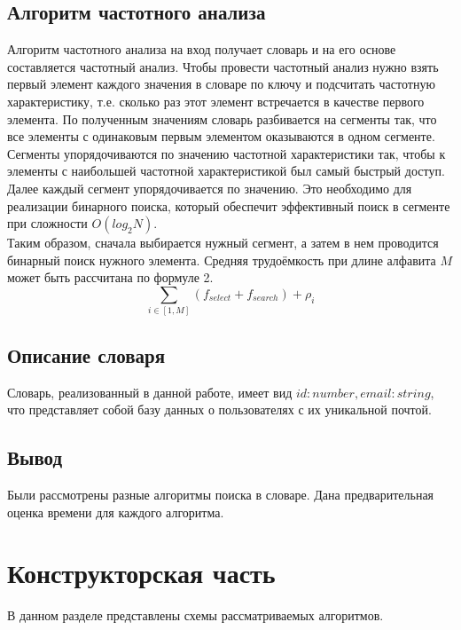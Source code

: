 \documentclass[a4paper, 12pt]{article}
\begin{document}
	\subsection{Алгоритм частотного анализа}
	\hspace*{5mm}Алгоритм частотного анализа на вход получает словарь и на его основе составляется частотный анализ. Чтобы провести частотный анализ нужно взять первый элемент каждого значения в словаре по ключу и подсчитать частотную характеристику, т.е. сколько раз этот элемент встречается в качестве первого элемента. По полученным значениям словарь разбивается на сегменты так, что все элементы с одинаковым первым элементом оказываются в одном сегменте.
	\\ \hspace*{5mm} Сегменты упорядочиваются по значению частотной характеристики так, чтобы к элементы с наибольшей частотной характеристикой был самый быстрый доступ.
	\\ \hspace*{5mm} Далее каждый сегмент упорядочивается по значению. Это необходимо
	для реализации бинарного поиска, который обеспечит эффективный поиск
	в сегменте при сложности $O(log_2N)$.
	\\ \hspace*{5mm} Таким образом, сначала выбирается нужный сегмент, а затем в нем проводится бинарный поиск нужного элемента. Средняя трудоёмкость при длине алфавита $M$ может быть рассчитана по формуле 2.
	\begin{equation}
		\sum\limits_{i\in[1, M]}(f_{select} + f_{search}) + \rho_i
	\end{equation}
	\subsection{Описание словаря}
	\hspace*{5mm} Словарь, реализованный в данной работе, имеет вид ${id: number, email: string}$, что представляет собой базу данных о пользователях с их уникальной почтой.
	\subsection{Вывод}
	\hspace*{5mm} Были рассмотрены разные алгоритмы поиска в словаре. Дана предварительная оценка времени для каждого алгоритма.


\newpage
\section{Конструкторская часть}
	\hspace*{5mm} В данном разделе представлены схемы рассматриваемых алгоритмов.
	
\end{document}
